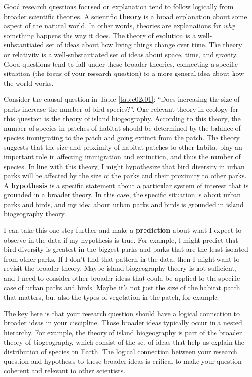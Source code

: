 \documentclass[
]{book}
\begin{document}
Good research questions focused on explanation tend to follow logically from broader scientific theories. A scientific \textbf{theory} is a broad explanation about some aspect of the natural world. In other words, theories are explanations for \emph{why} something happens the way it does. The theory of evolution is a well-substantiated set of ideas about how living things change over time. The theory or relativity is a well-substantiated set of ideas about space, time, and gravity. Good questions tend to fall under these broader theories, connecting a specific situation (the focus of your research question) to a more general idea about how the world works.

Consider the causal question in Table \ref{tab:c02c01}: ``Does increasing the size of parks increase the number of bird species?''. One relevant theory in ecology for this question is the theory of island biogeography. According to this theory, the number of species in patches of habitat should be determined by the balance of species immigrating to the patch and going extinct from the patch. The theory suggests that the size and proximity of habitat patches to other habitat play an important role in affecting immigration and extinction, and thus the number of species. In line with this theory, I might hypothesize that bird diversity in urban parks will be affected by the size of the parks and their proximity to other parks. A \textbf{hypothesis} is a specific statement about a particular system of interest that is grounded in a broader theory. In this case, the specific situation is about urban parks and birds, and my idea about urban parks and birds is grounded in island biogeography theory.

I can take this one step further and make a \textbf{prediction} about what I expect to observe in the data if my hypothesis is true. For example, I might predict that bird diversity is greatest in the biggest parks and parks that are the least isolated from other parks. If I don't find that pattern in the data, then I might want to revisit the broader theory. Maybe island biogeography theory is not sufficient, and I need to consider other broader ideas that could be applied to the specific case of urban parks and birds. Maybe it's not just the size of the habitat patch that matters, but also the types of vegetation in the patch, for example.

The key here is that your research question should have a logical connection to broader ideas in your discipline. Those broader ideas typically occur in a nested hierarchy. For example, the theory of island biogeography is part of the broader theory of biogeography, which consist of the set of ideas that help us explain the distribution of species on Earth. The logical connection between your research question and hypothesis to these broader ideas is critical to make your question coherent and relevant to other scientists.
\end{document}
